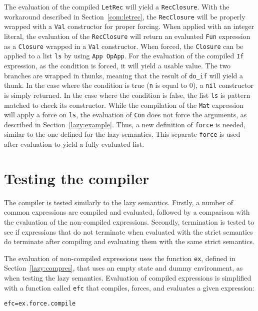 The evaluation of the compiled \texttt{LetRec} will yield a \texttt{RecClosure}.
With the workaround described in Section~\ref{com:letrec}, the \texttt{RecClosure}
will be properly wrapped with a \texttt{Val} constructor for proper forcing.
When applied with an integer literal, the evaluation of the \texttt{RecClosure}
will return an evaluated \texttt{Fun} expression as a \texttt{Closure} wrapped
in a \texttt{Val} constructor. When forced, the \texttt{Closure} can be applied
to a list \texttt{ls} by using \texttt{App OpApp}. For the evaluation of the
compiled \texttt{If} expression, as the condition is forced, it will yield a
usable value. The two branches are wrapped in thunks, meaning that the result
of \texttt{do\_if} will yield a thunk. In the case where the condition is true
(\texttt{n} is equal to 0), a \texttt{nil} constructor is simply returned.
In the case where the condition is false, the list \texttt{ls} is pattern matched
to check its constructor. While the compilation of the \texttt{Mat} expression
will apply a force on \texttt{ls}, the evaluation of \texttt{Con} does not force
the arguments, as described in Section~\ref{lazy:example}. Thus, a new
definition of \texttt{force} is needed, similar to the one defined for the lazy
semantics. This separate \texttt{force} is used after evaluation to yield a
fully evaluated list.


\section{Testing the compiler}
\label{compiler:test}
The compiler is tested similarly to the lazy semantics. Firstly, a number of
common expressions are compiled and evaluated, followed by a comparison with
the evaluation of the non-compiled expressions. Secondly, termination is tested
to see if expressions that do not terminate when evaluated with the strict
semantics do terminate after compiling and evaluating them with the same
strict semantics.

The evaluation of non-compiled expressions uses the function \texttt{ex},
defined in Section~\ref{lazy:compres}, that uses an empty state and
dummy environment, as when testing the lazy semantics. Evaluation of
compiled expressions is simplified with a function called \texttt{efc} that
compiles, forces, and evaluates a given expression:

\begin{alltt}
  efc = ex . force . compile
\end{alltt}

